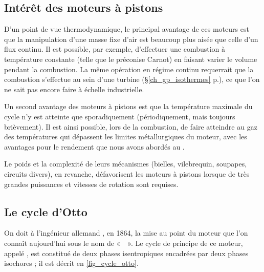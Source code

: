 	\subsection{Intérêt des moteurs à pistons}

		D’un point de vue thermodynamique, le principal avantage de ces moteurs est que la manipulation d’une masse fixe d’air est beaucoup plus aisée que celle d’un flux continu. Il est possible, par exemple, d’effectuer une combustion à température constante (telle que le préconise Carnot) en faisant varier le volume pendant la combustion. La même opération en régime continu requerrait que la combustion s’effectue au sein d’une turbine (\S\ref{ch_gp_isothermes} p.\pageref{ch_gp_isothermes}), ce que l’on ne sait pas encore faire à échelle industrielle.

		Un second avantage des moteurs à pistons est que la température maximale du cycle n’y est atteinte que sporadiquement (périodiquement, mais toujours brièvement). Il est ainsi possible, lors de la combustion, de faire atteindre au gaz des températures qui dépassent les limites métallurgiques du moteur, avec les avantages pour le rendement que nous avons abordés au \courssept.

		Le poids et la complexité de leurs mécanismes (bielles, vilebrequin, soupapes, circuits divers), en revanche, défavorisent les moteurs à pistons lorsque de très grandes puissances et vitesses de rotation sont requises.


	\subsection{Le cycle d’Otto}
	\label{ch_cycle_otto}
	
		On doit à l’ingénieur allemand , en 1864, la mise au point du moteur que l’on connaît aujourd’hui sous le nom de «~~». Le cycle de principe de ce moteur, appelé , est constitué de deux phases isentropiques encadrées par deux phases isochores ; il est décrit en \cref{fig_cycle_otto}.
		
